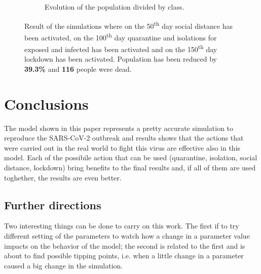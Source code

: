 \documentclass[12pt]{llncs}
\begin{document}
\begin{figure}
\begin{subfigure}{\textwidth}
{
    }
		\caption{Evolution of the population divided by class.} \label{fig:comb-a}
		\end{subfigure}
	\caption{Result of the simulations where on the 50\textsuperscript{th} day social distance has been activated, on the 100\textsuperscript{th} day quarantine and isolations for exposed and infected has been activated and on the 150\textsuperscript{th} day lockdown has been activated. Population has been reduced by \textbf{39.3\%} and \textbf{116} people were dead.}
	\label{fig:comb}
\end{figure}

\newpage
\section{Conclusions}
The model shown in this paper represents a pretty accurate simulation to reproduce the SARS-CoV-2 outbreak and results shows that the actions that were carried out in the real world to fight this virus are effective also in this model. Each of the possibile action that can be used (quarantine, isolation, social distance, lockdown) bring benefits to the final results and, if all of them are used toghether, the results are even better.

\subsection*{Further directions}
Two interesting things can be done to carry on this work. The first if to try different setting of the parameters to watch how a change in a parameter value impacts on the behavior of the model; the second is related to the first and is about to find possible tipping points, i.e. when a little change in a parameter caused a big change in the simulation.

\printbibliography[title={References}]
\end{document}

